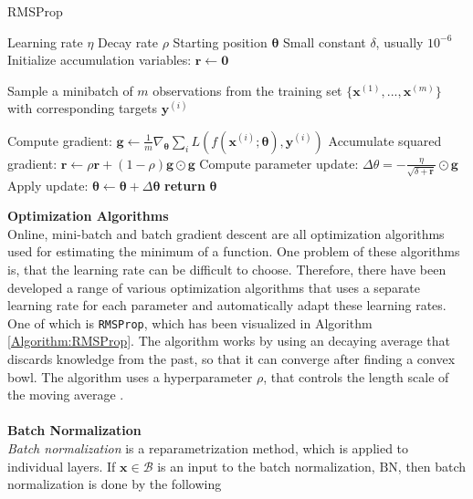 \documentclass[./main.tex]{subfiles}
\begin{document}
\begin{algorithm}[h]
    \caption{RMSProp \cite{DeepLearning}}
    \label{Algorithm:RMSProp}
    \begin{algorithmic}[1]
        \Require Learning rate $\eta$
        \Require Decay rate $\rho$
        \Require Starting position $\bm{\theta}$
        \Require Small constant $\delta$, usually $10^{-6}$
        \State Initialize accumulation variables: $\bm{r} \gets \bm{0}$
            \State \begin{varwidth}[t]{\linewidth}
            Sample a minibatch of $m$ observations from the training set $\{\bm{x}^{(1)}, ..., \bm{x}^{(m)}\}$ with corresponding targets $\bm{y}^{(i)}$
            \end{varwidth}
            \State Compute gradient: $\bm{g} \gets \frac{1}{m} \nabla_{\bm{\theta}} \sum_i L(f(\bm{x}^{(i)}; \bm{\theta}), \bm{y}^{(i)})$
            \State Accumulate squared gradient: $\bm{r} \gets \rho \bm{r} + (1 - \rho) \bm{g} \odot \bm{g}$
            \State Compute parameter update: $\Delta\theta = - \frac{\eta}{\sqrt{\delta + \bm{r}}} \odot \bm{g}$
            \State Apply update: $\bm{\theta} \gets \bm{\theta} + \Delta \bm{\theta}$ 
        \EndWhile
        \State \textbf{return} $\bm{\theta}$
    \end{algorithmic}
\end{algorithm}
\noindent \textbf{Optimization Algorithms} \\
\noindent Online, mini-batch and batch gradient descent are all optimization algorithms used for estimating the minimum of a function. One problem of these algorithms is, that the learning rate can be difficult to choose. Therefore, there have been developed a range of various optimization algorithms that uses a separate learning rate for each parameter and automatically adapt these learning rates. One of which is \texttt{RMSProp}, which has been visualized in Algorithm \ref{Algorithm:RMSProp}. The algorithm works by using an decaying average that discards knowledge from the past, so that it can converge after finding a convex bowl. The algorithm uses a hyperparameter $\rho$, that controls the length scale of the moving average \cite{DeepLearning}.
\\
\\
\textbf{Batch Normalization} \\
\textit{Batch normalization} is a reparametrization method, which is applied to individual layers. If $\bm{x} \in \mathcal{B}$ is an input to the batch normalization, $\text{BN}$, then batch normalization is done by the following
\end{document}
